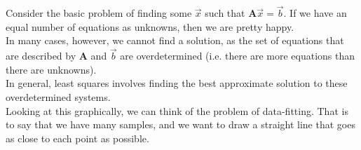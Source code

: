 Consider the basic problem of finding some $\vec{x}$ such that $\mathbf{A}\vec{x} = \vec{b}$. If we have an equal number of equations as unknowns, then we are pretty happy.\\

In many cases, however, we cannot find a solution, as the set of equations that are described by $\mathbf{A}$ and $\vec{b}$ are overdetermined (i.e. there are more equations than there are unknowns).\\

In general, least squares involves finding the best approximate solution to these overdetermined systems.\\
    
Looking at this graphically, we can think of the problem of data-fitting. That is to say that we have many samples, and we want to draw a straight line that goes as close to each point as possible.\\

